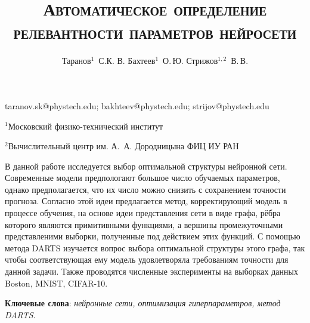 \documentclass[12pt, twoside]{article}
\begin{document}
\title{\textsc{Автоматическое определение релевантности параметров нейросети}}

\author
    {Таранов$^1$~С.К. В. Бахтеев$^1$~О.\,Ю.  Стрижов$^{1,2}$~В.\,В.} 

\email
    {taranov.sk@phystech.edu; bakhteev@phystech.edu; strijov@phystech.edu}
    
\organization
    {$^1$Московский физико-технический институт\par
    $^2$Вычислительный центр им. А.~А. Дородницына ФИЦ ИУ РАН}

\abstract
	{В данной работе исследуется выбор оптимальной структуры нейронной сети. Современные модели предпологают большое число обучаемых параметров, однако предполагается, что их число можно снизить с сохранением точности прогноза. Согласно этой идеи предлагается метод, корректирующий модель в процессе обучения, на основе идеи представления сети в виде графа, рёбра которого являются примитивными функциями, а вершины промежуточными представленими выборки, полученные под действием этих функций. С помощью метода DARTS изучается вопрос выбора оптимальной структуры этого графа, так чтобы соответствующая ему модель удовлетворяла требованиям точности для данной задачи. Также проводятся численные эксперименты на выборках данных Boston, MNIST, CIFAR-10.

\bigskip
\textbf{Ключевые слова}: \emph {нейронные сети, оптимизация гиперпараметров, метод DARTS}.

}

\maketitle
\end{document}

